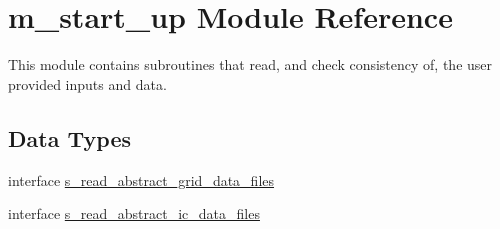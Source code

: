 \hypertarget{namespacem__start__up}{}\section{m\+\_\+start\+\_\+up Module Reference}
\label{namespacem__start__up}


This module contains subroutines that read, and check consistency of, the user provided inputs and data.  


\subsection*{Data Types}
\begin{DoxyCompactItemize}
\item 
interface \hyperlink{interfacem__start__up_1_1s__read__abstract__grid__data__files}{s\+\_\+read\+\_\+abstract\+\_\+grid\+\_\+data\+\_\+files}
\item 
interface \hyperlink{interfacem__start__up_1_1s__read__abstract__ic__data__files}{s\+\_\+read\+\_\+abstract\+\_\+ic\+\_\+data\+\_\+files}
\end{DoxyCompactItemize}
